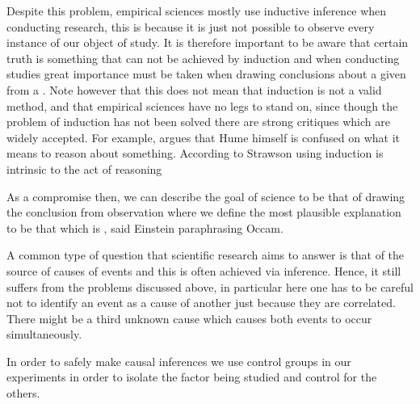{{ 		\par{Despite this problem, empirical sciences mostly use inductive inference when conducting research, this is because it is just not possible to observe every instance of our object of study. It is therefore important to be aware that certain truth is something that can not be achieved by induction and when conducting studies great importance must be taken when drawing conclusions about a given  from a . Note however that this does not mean that induction is not a valid method, and that empirical sciences have no legs to stand on, since though the problem of induction has not been solved there are strong critiques which are widely accepted. For example,  argues that Hume himself is confused on what it means to reason about something. According to Strawson using induction is intrinsic to the act of reasoning}



 		\par{As a compromise then, we can describe the goal of science to be that of drawing the  conclusion from observation where we define the most plausible explanation to be that which is , said Einstein paraphrasing Occam.  



 			\par{A common type of question that scientific research aims to answer is that of the source of causes of events and this is often achieved via inference. Hence, it still suffers from the problems discussed above, in particular here one has to be careful not to identify an event as a cause of another just because they are correlated. There might be a third unknown cause which causes both events to occur simultaneously.}
 			\par{In order to safely make causal inferences we use control groups in our experiments in order to isolate the factor being studied and control for the others.}

}}}
